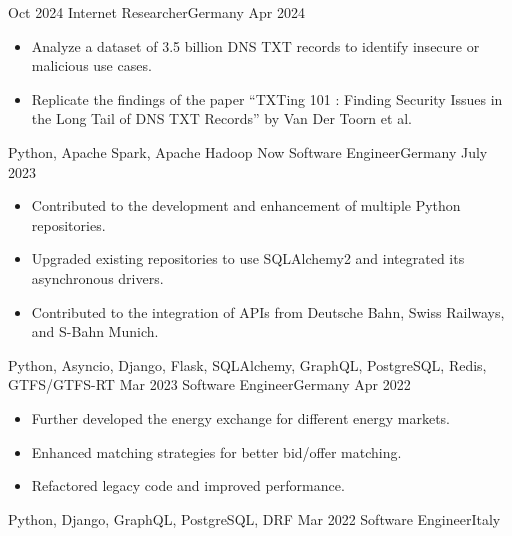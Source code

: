 %
%
%

\begin{experiences}
  \experience
    {Oct 2024} {Internet Researcher}{}{Germany}
    {Apr 2024} {
      \begin{itemize}
        \item Analyze a dataset of 3.5 billion DNS TXT records to identify insecure or malicious use cases.
        \item Replicate the findings of the paper “TXTing 101 : Finding
        Security Issues in the Long Tail of DNS TXT Records” by Van Der Toorn et al.
      \end{itemize}
    }
    {Python, Apache Spark, Apache Hadoop}
  \emptySeparator
  \experience
    {Now} {Software Engineer}{}{Germany}
    {July 2023} {
      \begin{itemize}
        \item Contributed to the development and enhancement of multiple Python repositories.
        \item Upgraded existing repositories to use SQLAlchemy2 and integrated its asynchronous drivers.
        \item Contributed to the integration of APIs from Deutsche Bahn, Swiss Railways, and S-Bahn Munich.
      \end{itemize}
    }
    {Python, Asyncio, Django, Flask, SQLAlchemy, GraphQL, PostgreSQL, Redis, GTFS/GTFS-RT}
  \emptySeparator
  \experience
  {Mar 2023} {Software Engineer}{}{Germany}
  {Apr 2022} {
    \begin{itemize}
      \item Further developed the energy exchange for different energy markets.
      \item Enhanced matching strategies for better bid/offer matching.
      \item Refactored legacy code and improved performance.
    \end{itemize}
  }
  {Python, Django, GraphQL, PostgreSQL, DRF}
  \emptySeparator
  \experience
  {Mar 2022} {Software Engineer}{}{Italy}

\end{experiences}
